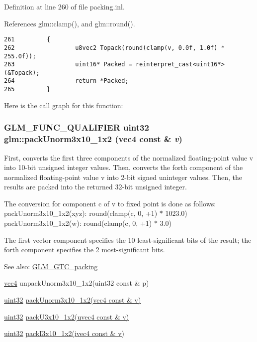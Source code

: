 Definition at line 260 of file packing.inl.

References glm::clamp(), and glm::round().

\begin{Code}\begin{verbatim}261         {
262                 u8vec2 Topack(round(clamp(v, 0.0f, 1.0f) * 255.0f));
263                 uint16* Packed = reinterpret_cast<uint16*>(&Topack);
264                 return *Packed;
265         }
\end{verbatim}
\end{Code}




Here is the call graph for this function:\hypertarget{group__gtc__packing_g2cf2d11b40bd48639110456fd74c2e33}{
\subsubsection[packUnorm3x10\_\-1x2]{\setlength{\rightskip}{0pt plus 5cm}GLM\_\-FUNC\_\-QUALIFIER uint32 glm::packUnorm3x10\_\-1x2 (vec4 const \& {\em v})}}
\label{group__gtc__packing_g2cf2d11b40bd48639110456fd74c2e33}


First, converts the first three components of the normalized floating-point value v into 10-bit unsigned integer values. Then, converts the forth component of the normalized floating-point value v into 2-bit signed uninteger values. Then, the results are packed into the returned 32-bit unsigned integer.

The conversion for component c of v to fixed point is done as follows: packUnorm3x10\_\-1x2(xyz): round(clamp(c, 0, +1) $\ast$ 1023.0) packUnorm3x10\_\-1x2(w): round(clamp(c, 0, +1) $\ast$ 3.0)

The first vector component specifies the 10 least-significant bits of the result; the forth component specifies the 2 most-significant bits.

\begin{Desc}
\item[See also:]\hyperlink{group__gtc__packing}{GLM\_\-GTC\_\-packing} 

\hyperlink{group__core__types_g5881b1b022d7fd1b7218f5916532dd02}{vec4} unpackUnorm3x10\_\-1x2(uint32 const \& p) 

\hyperlink{group__gtc__type__precision_g202b6a53c105fcb7e531f9b443518451}{uint32} \hyperlink{group__gtc__packing_g2cf2d11b40bd48639110456fd74c2e33}{packUnorm3x10\_\-1x2(vec4 const \& v)} 

\hyperlink{group__gtc__type__precision_g202b6a53c105fcb7e531f9b443518451}{uint32} \hyperlink{group__gtc__packing_gf656d8862628f96b20de7a36eaa1fe56}{packU3x10\_\-1x2(uvec4 const \& v)} 

\hyperlink{group__gtc__type__precision_g202b6a53c105fcb7e531f9b443518451}{uint32} \hyperlink{group__gtc__packing_g032e18fa5bc5b8f3897104aeb2f1e195}{packI3x10\_\-1x2(ivec4 const \& v)} \end{Desc}


